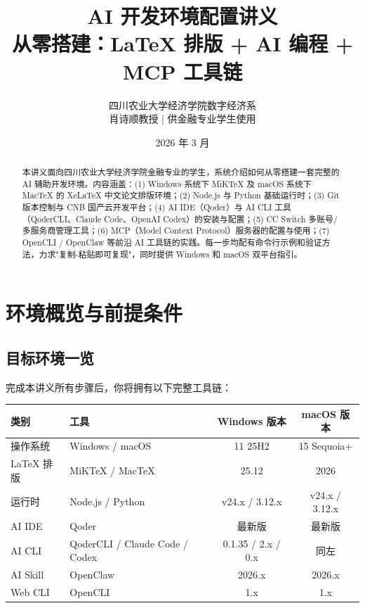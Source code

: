 \documentclass[12pt,a4paper]{ctexart}
\title{
  \vspace{-2cm}
  {\LARGE\bfseries AI 开发环境配置讲义} \\[0.5em]
  {\large 从零搭建：LaTeX 排版 + AI 编程 + MCP 工具链}
}
\author{
  四川农业大学经济学院数字经济系 \\
  肖诗顺\;教授 \;|\; 供金融专业学生使用
}
\date{2026 年 3 月}
\begin{document}
\maketitle

\begin{abstract}
本讲义面向四川农业大学经济学院金融专业的学生，系统介绍如何从零搭建一套完整的 AI 辅助开发环境。内容涵盖：(1) Windows 系统下 MiKTeX 及 macOS 系统下 MacTeX 的 XeLaTeX 中文论文排版环境；(2) Node.js 与 Python 基础运行时；(3) Git 版本控制与 CNB 国产云开发平台；(4) AI IDE（Qoder）与 AI CLI 工具（QoderCLI、Claude Code、OpenAI Codex）的安装与配置；(5) CC Switch 多账号/多服务商管理工具；(6) MCP（Model Context Protocol）服务器的配置与使用；(7) OpenCLI / OpenClaw 等前沿 AI 工具链的实践。每一步均配有命令行示例和验证方法，力求"复制-粘贴即可复现"，同时提供 Windows 和 macOS 双平台指引。
\end{abstract}

\tableofcontents
\clearpage

\section{环境概览与前提条件}

\subsection{目标环境一览}

完成本讲义所有步骤后，你将拥有以下完整工具链：

\begin{table}[H]
\centering
\begin{tabular}{llcc}
\toprule
\textbf{类别} & \textbf{工具} & \textbf{Windows 版本} & \textbf{macOS 版本} \\
\midrule
操作系统 & Windows / macOS & 11 25H2 & 15 Sequoia+ \\
LaTeX 排版 & MiKTeX / MacTeX & 25.12 & 2026 \\
运行时 & Node.js / Python & v24.x / 3.12.x & v24.x / 3.12.x \\
AI IDE & Qoder & 最新版 & 最新版 \\
AI CLI & QoderCLI / Claude Code / Codex & 0.1.35 / 2.x / 0.x & 同左 \\
AI Skill & OpenClaw & 2026.x & 2026.x \\
Web CLI & OpenCLI & 1.x & 1.x \\
\bottomrule
\end{tabular}
\end{table}
\end{document}
